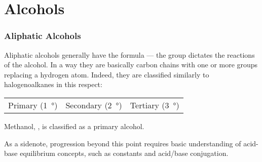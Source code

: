 

\pagebreak
\part{Alcohols}
\hypertarget{ChapterAlcohols}{}

	\section{Aliphatic Alcohols}
		Aliphatic alcohols generally have the formula  –– the  group dictates the reactions of the alcohol. In a way they
		are basically carbon chains with one or more  groups replacing a hydrogen atom. Indeed, they are classified similarly to
		halogenoalkanes in this respect:

		\begin{center}\begin{table}[ht]\renewcommand{\arraystretch}{1.4}
		\begin{tabu} to \textwidth {| X[c,m] | X[c,m] | X[c,m] |}

			\hline
			\vspace{2mm}					\vspace{2mm}	&
			\vspace{2mm}			\vspace{2mm}	&
			\vspace{2mm}		\vspace{2mm}	\\

			\hline
			Primary (\SI{1}{\degree})		&
			Secondary (\SI{2}{\degree})		&
			Tertiary (\SI{3}{\degree})		\\
			\hline

		\end{tabu}
		\end{table}\end{center}\vspace{-10mm}

		Methanol, , is classified as a primary alcohol.

		As a sidenote, progression beyond this point requires basic understanding of acid-base equilibrium concepts, such as \Ka constants
		and acid/base conjugation.

